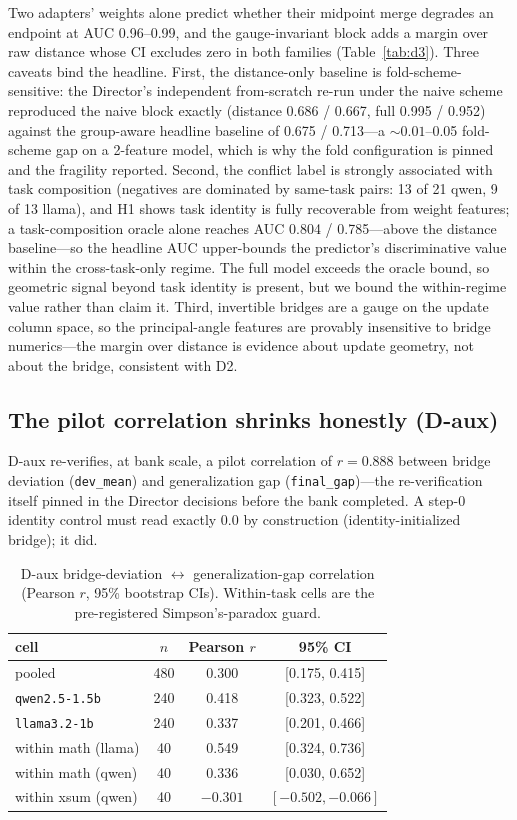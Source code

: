 \documentclass{article}
\begin{document}
Two adapters' weights alone predict whether their midpoint merge degrades
an endpoint at AUC 0.96--0.99, and the gauge-invariant block adds a margin
over raw distance whose CI excludes zero in both families
(Table~\ref{tab:d3}). Three caveats bind the headline. First, the
distance-only baseline is fold-scheme-sensitive: the Director's independent
from-scratch re-run under the naive scheme reproduced the naive block
exactly (distance 0.686 / 0.667, full 0.995 / 0.952) against the
group-aware headline baseline of 0.675 / 0.713---a ${\sim}0.01$--0.05
fold-scheme gap on a 2-feature model, which is why the fold configuration
is pinned and the fragility reported. Second, the conflict label is
strongly associated with task composition (negatives are dominated by
same-task pairs: 13 of 21 qwen, 9 of 13 llama), and H1 shows task identity
is fully recoverable from weight features; a task-composition oracle alone
reaches AUC 0.804 / 0.785---above the distance baseline---so the headline
AUC upper-bounds the predictor's discriminative value within the
cross-task-only regime. The full model exceeds the oracle bound, so
geometric signal beyond task identity is present, but we bound the
within-regime value rather than claim it. Third, invertible bridges are a
gauge on the update column space, so the principal-angle features are
provably insensitive to bridge numerics---the margin over distance is
evidence about update geometry, not about the bridge, consistent with D2.

\subsection{The pilot correlation shrinks honestly (D-aux)}
\label{sec:daux}

D-aux re-verifies, at bank scale, a pilot correlation of $r = 0.888$
between bridge deviation (\texttt{dev\_mean}) and generalization gap
(\texttt{final\_gap})---the re-verification itself pinned in the Director
decisions before the bank completed. A step-0 identity control must read
exactly 0.0 by construction (identity-initialized bridge); it did.

\begin{table}[ht]
\centering
\caption{D-aux bridge-deviation $\leftrightarrow$ generalization-gap
correlation (Pearson $r$, 95\% bootstrap CIs). Within-task cells are the
pre-registered Simpson's-paradox guard.}
\label{tab:daux}
\begin{tabular}{lccc}
\toprule
cell & $n$ & Pearson $r$ & 95\% CI \\
\midrule
pooled & 480 & 0.300 & [0.175, 0.415] \\
\texttt{qwen2.5-1.5b} & 240 & 0.418 & [0.323, 0.522] \\
\texttt{llama3.2-1b} & 240 & 0.337 & [0.201, 0.466] \\
within math (llama) & 40 & 0.549 & [0.324, 0.736] \\
within math (qwen) & 40 & 0.336 & [0.030, 0.652] \\
within xsum (qwen) & 40 & $-0.301$ & $[-0.502, -0.066]$ \\
\bottomrule
\end{tabular}
\end{table}
\end{document}
